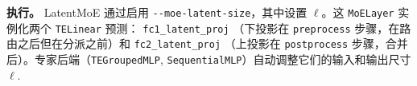 \textbf{执行。}
LatentMoE 通过启用 \texttt{-{}-moe-latent-size}，其中设置 \(\ell\)。这 \texttt{MoELayer} 实例化两个 \texttt{TELinear} 预测： \texttt{fc1\_latent\_proj} （下投影在 \texttt{preprocess} 步骤，在路由之后但在分派之前）和 \texttt{fc2\_latent\_proj} （上投影在 \texttt{postprocess} 步骤，合并后）。专家后端（\texttt{TEGroupedMLP}, \texttt{SequentialMLP}）自动调整它们的输入和输出尺寸 \(\ell\).

